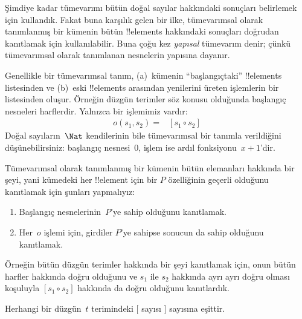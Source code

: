 



Şimdiye kadar tümevarımı bütün doğal sayılar hakkındaki sonuçları
belirlemek için kullandık. Fakat buna karşılık gelen bir ilke,
tümevarımsal olarak tanımlanmış bir kümenin bütün !!{element}s
hakkındaki sonuçları doğrudan kanıtlamak için kullanılabilir. Buna çoğu
kez \emph{yapısal} tümevarım denir; çünkü tümevarımsal olarak tanımlanan
nesnelerin yapısına dayanır.

Genellikle bir tümevarımsal tanım, (a)~kümenin ``başlangıçtaki''
!!{element}s listesinden ve (b)~eski !!{element}s arasından yenilerini üreten
işlemlerin bir listesinden oluşur. Örneğin düzgün terimler söz konusu
olduğunda başlangıç nesneleri harflerdir. Yalnızca bir işlemimiz vardır:
\begin{align*}
  o(s_1, s_2) = & [s_1 \circ s_2]
\end{align*}
Doğal sayıların~$\Nat$ kendilerinin bile tümevarımsal bir tanımla
verildiğini düşünebilirsiniz: başlangıç nesnesi~$0$, işlem ise ardıl
fonksiyonu~$x + 1$'dir.

Tümevarımsal olarak tanımlanmış bir kümenin bütün elemanları hakkında
bir şeyi, yani kümedeki her !!{element} için bir $P$ özelliğinin geçerli
olduğunu kanıtlamak için şunları yapmalıyız:
\begin{enumerate}
\item Başlangıç nesnelerinin~$P$'ye sahip olduğunu kanıtlamak.
\item Her~$o$ işlemi için, girdiler $P$'ye sahipse sonucun da sahip
  olduğunu kanıtlamak.
\end{enumerate}
Örneğin bütün düzgün terimler hakkında bir şeyi kanıtlamak için, onun
bütün harfler hakkında doğru olduğunu ve $s_1$ ile $s_2$ hakkında ayrı
ayrı doğru olması koşuluyla $[s_1 \circ s_2]$ hakkında da doğru olduğunu
kanıtlardık.

\begin{prop}
  Herhangi bir düzgün~$t$ terimindeki $[$ sayısı $]$ sayısına eşittir.
\end{prop}

